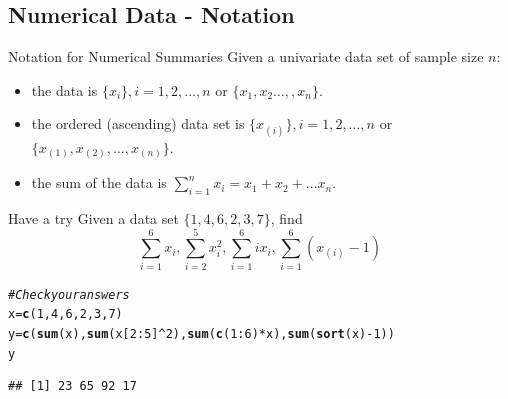 \documentclass[t,xcolor=pdftex,dvipsnames,table]{beamer}
\makeatletter
\newcommand{\hlnum}[1]{\textcolor[rgb]{0.686,0.059,0.569}{#1}}%
\newcommand{\hlcom}[1]{\textcolor[rgb]{0.678,0.584,0.686}{\textit{#1}}}%
\newcommand{\hlopt}[1]{\textcolor[rgb]{0,0,0}{#1}}%
\newcommand{\hlstd}[1]{\textcolor[rgb]{0.345,0.345,0.345}{#1}}%
\newcommand{\hlkwb}[1]{\textcolor[rgb]{0.69,0.353,0.396}{#1}}%
\newcommand{\hlkwd}[1]{\textcolor[rgb]{0.737,0.353,0.396}{\textbf{#1}}}%
\newenvironment{kframe}{%
 \def\at@end@of@kframe{}%
 \ifinner\ifhmode%
  \def\at@end@of@kframe{\end{minipage}}%
  \begin{minipage}{\columnwidth}%
 \fi\fi%
 \def\FrameCommand##1{\hskip\@totalleftmargin \hskip-\fboxsep
 \colorbox{shadecolor}{##1}\hskip-\fboxsep
     \hskip-\linewidth \hskip-\@totalleftmargin \hskip\columnwidth}%
 \MakeFramed {\advance\hsize-\width
   \@totalleftmargin\z@ \linewidth\hsize
   \@setminipage}}%
 {\par\unskip\endMakeFramed%
 \at@end@of@kframe}
\newenvironment{knitrout}{}{} %
\makeatother
\begin{document}
\subsection[]{Numerical Data - Notation}
\begin{frame}{Notation for Numerical Summaries}
Given a univariate data set of sample size $n$:

\begin{itemize}
\item
the data is $ \{ x_i \},i=1,2,\ldots,n$   or  $\{ x_{1},x_{2} \ldots, ,x_{n} \}$. 

\vspace{.5cm}
\item the ordered (ascending) data set is $ \{ x_{(i)} \},i=1,2,\ldots,n$ or 
$\{ x_{(1)},x_{(2)},\ldots,x_{(n)} \}$.

\vspace{.5cm}
\item 
the sum of the data is $\sum_{i=1}^{n} x_i = x_1+ x_2+\ldots x_n$.
\end{itemize}
\end{frame}

\begin{frame}[fragile]{}
\begin{alertblock}{Have a try}
Given a data set $\{ 1,4,6,2,3,7\}$, find
\[ \sum_{i=1}^{6} x_{i},  \sum_{i=2}^{5} x_{i}^2, \sum_{i=1}^{6} i x_{i}, \sum_{i=1}^{6} (x_{(i)}-1) \]
\end{alertblock}

\begin{knitrout}
\color{fgcolor}\begin{kframe}
\begin{alltt}
\hlcom{#Check your answers}
\hlstd{x}\hlkwb{=}\hlkwd{c}\hlstd{(}\hlnum{1}\hlstd{,}\hlnum{4}\hlstd{,}\hlnum{6}\hlstd{,}\hlnum{2}\hlstd{,}\hlnum{3}\hlstd{,}\hlnum{7}\hlstd{)}
\hlstd{y}\hlkwb{=}\hlkwd{c}\hlstd{(}\hlkwd{sum}\hlstd{(x),} \hlkwd{sum}\hlstd{(x[}\hlnum{2}\hlopt{:}\hlnum{5}\hlstd{]}\hlopt{^}\hlnum{2}\hlstd{),} \hlkwd{sum}\hlstd{(}\hlkwd{c}\hlstd{(}\hlnum{1}\hlopt{:}\hlnum{6}\hlstd{)}\hlopt{*}\hlstd{x),} \hlkwd{sum}\hlstd{(}\hlkwd{sort}\hlstd{(x)}\hlopt{-}\hlnum{1}\hlstd{))}
\hlstd{y}
\end{alltt}
\begin{verbatim}
## [1] 23 65 92 17
\end{verbatim}
\end{kframe}
\end{knitrout}
\href{www.mathsisfun.com/algebra/sigma-notation.html}{}
\end{frame}
\end{document}
